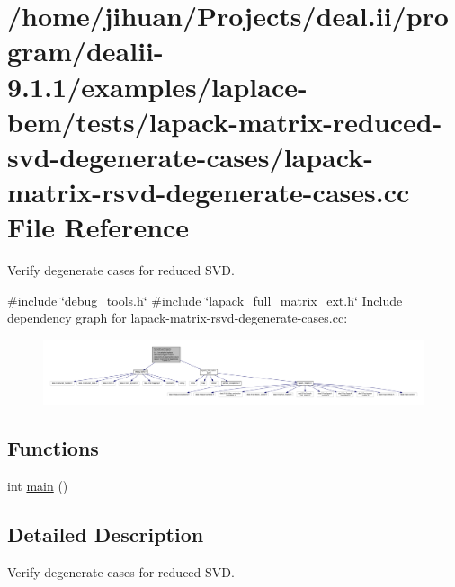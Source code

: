 \hypertarget{lapack-matrix-rsvd-degenerate-cases_8cc}{}\section{/home/jihuan/\+Projects/deal.ii/program/dealii-\/9.1.1/examples/laplace-\/bem/tests/lapack-\/matrix-\/reduced-\/svd-\/degenerate-\/cases/lapack-\/matrix-\/rsvd-\/degenerate-\/cases.cc File Reference}
\label{lapack-matrix-rsvd-degenerate-cases_8cc}


Verify degenerate cases for reduced S\+VD.  


{\ttfamily \#include \char`\"{}debug\+\_\+tools.\+h\char`\"{}}\newline
{\ttfamily \#include \char`\"{}lapack\+\_\+full\+\_\+matrix\+\_\+ext.\+h\char`\"{}}\newline
Include dependency graph for lapack-\/matrix-\/rsvd-\/degenerate-\/cases.cc\+:\nopagebreak
\begin{figure}[H]
\begin{center}
\leavevmode
\includegraphics[width=350pt]{lapack-matrix-rsvd-degenerate-cases_8cc__incl}
\end{center}
\end{figure}
\subsection*{Functions}
\begin{DoxyCompactItemize}
\item 
int \hyperlink{lapack-matrix-rsvd-degenerate-cases_8cc_ae66f6b31b5ad750f1fe042a706a4e3d4}{main} ()
\end{DoxyCompactItemize}


\subsection{Detailed Description}
Verify degenerate cases for reduced S\+VD. 

